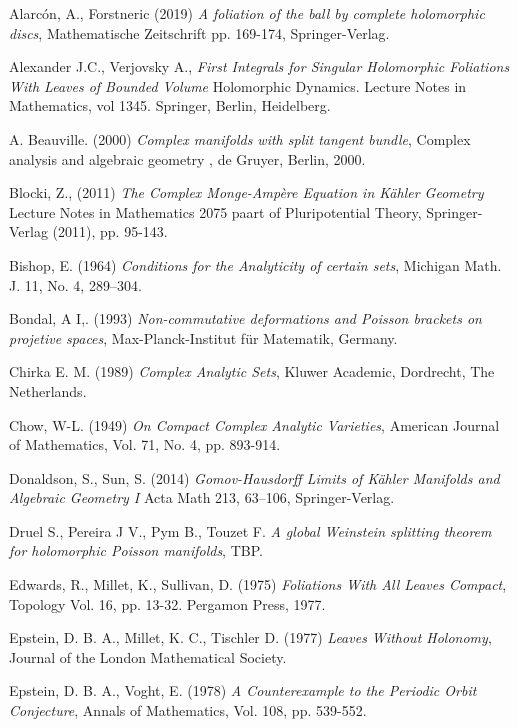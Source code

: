 \documentclass[letterpaper]{report}
\begin{document}
\begin{thebibliography}{3}

 Alarc\'on, A., Forstneric (2019) \textit{A foliation of the ball by complete holomorphic discs}, Mathematische Zeitschrift
pp. 169-174, Springer-Verlag.

 Alexander J.C., Verjovsky A., \textit{First Integrals for Singular Holomorphic Foliations With Leaves of Bounded Volume}
Holomorphic Dynamics. Lecture Notes in Mathematics, vol 1345. Springer, Berlin, Heidelberg.

 A. Beauville. (2000) \textit{Complex manifolds with split tangent bundle}, Complex analysis and algebraic geometry
, de Gruyer, Berlin, 2000.

 Blocki, Z., (2011) \textit{The Complex Monge-Amp\`ere Equation in K\"ahler Geometry} Lecture Notes in Mathematics 2075
paart of Pluripotential Theory, Springer-Verlag (2011), pp. 95-143.

 Bishop, E. (1964) \textit{Conditions for the Analyticity  of certain sets}, Michigan Math. J. 11, No. 4, 289--304. 

 Bondal, A I,. (1993) \textit{Non-commutative deformations and Poisson brackets on projetive spaces}, 
Max-Planck-Institut f\"ur Matematik, Germany.

 Chirka E. M. (1989) \textit{Complex Analytic Sets}, Kluwer
Academic, Dordrecht,  The Netherlands. 

 Chow, W-L. (1949) \textit{On Compact Complex Analytic Varieties},
American Journal of Mathematics, Vol. 71, No. 4, pp. 893-914.

 Donaldson, S., Sun, S. (2014) \textit{Gomov-Hausdorff Limits of K\"ahler Manifolds and Algebraic Geometry I}
 Acta Math 213, 63–106, Springer-Verlag.

Druel S., Pereira J V., Pym B., Touzet F. \textit{A global Weinstein splitting theorem for 
holomorphic Poisson manifolds}, TBP.

 Edwards, R., Millet, K., Sullivan, D. (1975) \textit{Foliations
With All Leaves Compact}, Topology Vol. 16, pp. 13-32. Pergamon Press, 1977.

 Epstein, D. B. A., Millet, K. C., Tischler D.
(1977) \textit{Leaves Without Holonomy}, Journal of the London Mathematical
Society.

 Epstein, D. B. A., Voght, E. (1978) \textit{A Counterexample to the Periodic Orbit Conjecture}, 
Annals of Mathematics, Vol. 108, pp. 539-552. 


\end{thebibliography}
\end{document}
